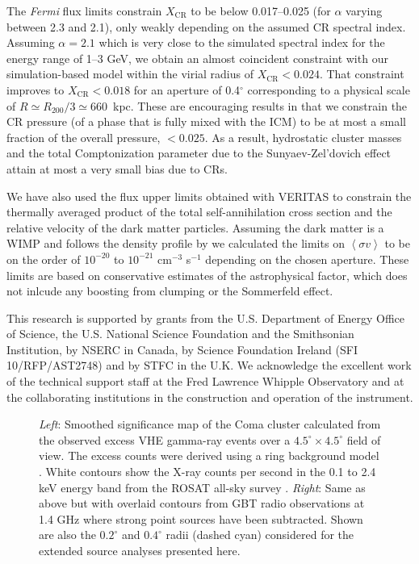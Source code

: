 \documentclass[12pt,manuscript]{aastex}
\def\Fermi{{\em Fermi}\xspace}
\newcommand{\expval}[1]{\left\langle #1 \right\rangle}
\newcommand{\CR}{\mathrm{CR}}
\begin{document}
The \Fermi flux limits constrain $X_\CR$ to be below 0.017--0.025 (for $\alpha$ varying
between 2.3 and 2.1), only weakly depending on the assumed CR spectral index. Assuming $\alpha=2.1$
which is very close to the simulated spectral index for the energy range of 1--3 GeV, we obtain an
almost coincident constraint with our simulation-based model within the virial radius of
$X_\CR<0.024$. That constraint improves to $X_{\CR}<0.018$ for an aperture of 0.4$^\circ$
corresponding to a physical scale of $R \simeq R_{200}/3 \simeq 660$~kpc. These are encouraging
results in that we constrain the CR pressure (of a phase that is fully mixed with the ICM) to be at
most a small fraction of the overall pressure, $<0.025$. As a result, hydrostatic cluster masses
and the total Comptonization parameter due to the Sunyaev-Zel'dovich effect attain at most a very
small bias due to CRs.

We have also used the flux upper limits obtained with VERITAS to constrain the thermally averaged
product of the total self-annihilation cross section and the relative velocity of the dark matter
particles. Assuming the dark matter is a WIMP and follows the density profile by 
\citet{article:NavarroFrenkWhite:1997} we calculated the limits on $\expval{\sigma v}$ to be on the
order of $10^{-20}$ to $10^{-21}$ cm$^{-3}$ s$^{-1}$ depending on the chosen aperture. These limits
are based on conservative estimates of the astrophysical factor, which does not inlcude any boosting
from clumping or the Sommerfeld effect.

\acknowledgments
This research is supported by grants from the U.S. Department of Energy Office of Science, the U.S.
National Science Foundation and the Smithsonian Institution, by NSERC in Canada, by Science
Foundation Ireland (SFI 10/RFP/AST2748) and by STFC in the U.K. We acknowledge the excellent work
of the technical support staff at the Fred Lawrence Whipple Observatory and at the collaborating
institutions in the construction and operation of the instrument.





\begin{figure*}
\begin{center}
\end{center}
\caption{\emph{Left}: Smoothed significance map of the Coma cluster calculated from the observed
excess VHE gamma-ray events over a $4.5^{\circ}\times 4.5^{\circ}$ field of view. The excess counts
were derived using a ring background model \citep{article:Aharonian_etal:2001}. White contours show
the X-ray counts per second in the 0.1 to 2.4 keV energy band from the ROSAT all-sky survey
\citep{article:BrielHenryBohringer:1992}. \emph{Right}: Same as above but with overlaid contours
from GBT radio observations at 1.4 GHz \citep{article:BrownRudnick:2010} where strong point sources
have been subtracted. Shown are also the $0.2^{\circ}$ and $0.4^{\circ}$ radii (dashed cyan)
considered for the extended source analyses presented here.}
\label{fig:skymaps}
\end{figure*}
\end{document}
